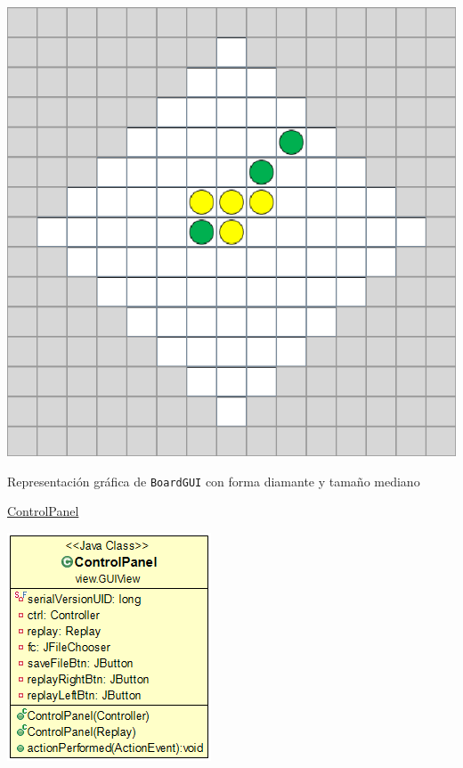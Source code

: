 \documentclass[12pt,a4paper,openright]{book}
\theoremstyle{break}
\begin{document}
\begin{center}
\includegraphics[scale=0.8]{boardgui.png}

Representación gráfica de \texttt{BoardGUI} con forma diamante y tamaño mediano
\end{center}

\newpage

\underline{ControlPanel}
\begin{center}
\includegraphics[scale=0.65]{controlpaneluml.png}
\end{center}
\end{document}
